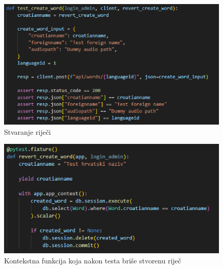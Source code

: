\begin{figure}[htp]
	\includegraphics[scale=0.9]{slike/test_word.png}
	\centering
	\caption{Stvaranje riječi}
	\label{fig:test-8}
\end{figure}

\begin{figure}[htp]
	\includegraphics[scale=1]{slike/fixture_word.png}
	\centering
	\caption{Kontekstna funkcija koja nakon testa briše stvorenu riječ}
	\label{fig:test-9}
\end{figure}

\clearpage

